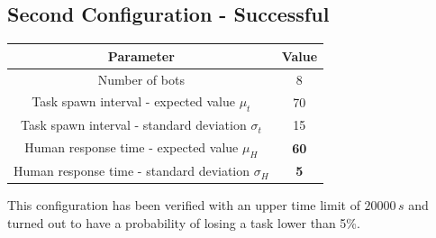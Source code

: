 \documentclass[10pt,a4paper]{article}
\begin{document}
		\subsection{Second Configuration - Successful}
			\label{sub:sim2}
			\begin{center}
				\begin{tabular}{ |c|c|}
					\hline
					Parameter & Value\\
					\hline
					\hline
					Number of bots & 8 \\
					\hline
					Task spawn interval - expected value $\mu_t$ & 70\\
					\hline					
					Task spawn interval - standard deviation $\sigma_t$ & 15\\
					\hline
					Human response time - expected value $\mu_H$ & \textbf{60}\footnotemark\\
					\hline					
					Human response time - standard deviation $\sigma_H$ & \textbf{5}\\
					\hline
				\end{tabular}
			\end{center}
			This configuration has been verified with an upper time limit of $20000\,s$ and turned out to have a probability of losing a task lower than 5\%.
			
\end{document}
